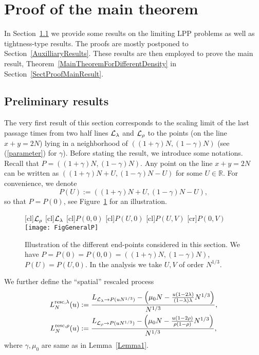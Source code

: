 \documentclass[12pt,a4paper]{article}
\numberwithin{equation}{section}
\newcommand{\R}{\mathbb{R}}
\begin{document}
\section{Proof of the main theorem}\label{BodyOfheProof}
In Section~\ref{SectPreliminary} we provide some results on the limiting LPP problems as well as tightness-type results. The proofs are mostly postponed to Section~\ref{AuxilliaryResults}. These results are then employed to prove the main result, Theorem~\ref{MainTheoremForDifferentDensity} in Section~\ref{SectProofMainResult}.

\subsection{Preliminary results}\label{SectPreliminary}
The very first result of this section corresponds to the scaling limit of the last passage times from two half lines $\cal{L}_{\lambda}$ and $\cal{L}_{\rho}$ to the points (on the line $x+y=2N$) lying in a neighborhood of $((1+\gamma)N, (1-\gamma)N)$ (see (\ref{parameter}) for $\gamma$). Before stating the result, we introduce some notations. Recall that $P=((1+\gamma)N,(1-\gamma)N)$. Any point on the line $x+y=2N$ can be written as $((1+\gamma)N+U,(1-\gamma)N-U)$ for some $U\in \R$. For convenience, we denote
\begin{equation}\label{eq:defPU}
P(U):=\left((1+\gamma)N+U, (1-\gamma)N-U\right),
\end{equation}
so that $P=P(0)$, see Figure~\ref{FigGeneralP} for an illustration.
%
\begin{figure}
\begin{center}
[cl]{${\cal L}_\rho$}
[cl]{${\cal L}_\lambda$}
[cl]{$P(0,0)$}
[cl]{$P(U,0)$}
[cl]{$P(U,V)$}
[cr]{$P(0,V)$}
\texttt{[image: FigGeneralP]}
\caption{Illustration of the different end-points considered in this section. We have $P=P(0)=P(0,0)=((1+\gamma)N,(1-\gamma)N)$, $P(U)=P(U,0)$. In the analysis we take $U,V$ of order $N^{1/3}$.}
\label{FigGeneralP}
\end{center}
\end{figure}
%
We further define the ``spatial'' rescaled process
\begin{equation}\label{eq:DefZeta1}
\begin{aligned}
 L^{{\rm resc},\lambda}_{N}(u)&:= \frac{L_{{\cal L}_{\lambda}\to P(uN^{1/3})}-\left(\mu_0 N - \frac{u(1-2\lambda)}{(1-\lambda)\lambda}N^{1/3}\right)}{N^{1/3}},\\
 L^{{\rm resc},\rho}_{N}(u) & := \frac{L_{{\cal L}_{\rho}\to P(uN^{1/3})}- \left(\mu_0 N - \frac{u(1-2\rho)}{\rho(1-\rho)}N^{1/3}\right)}{N^{1/3}},
 \end{aligned}
\end{equation}
 where $\gamma,\mu_0$ are same as in Lemma~\ref{Lemma1}.
\end{document}
